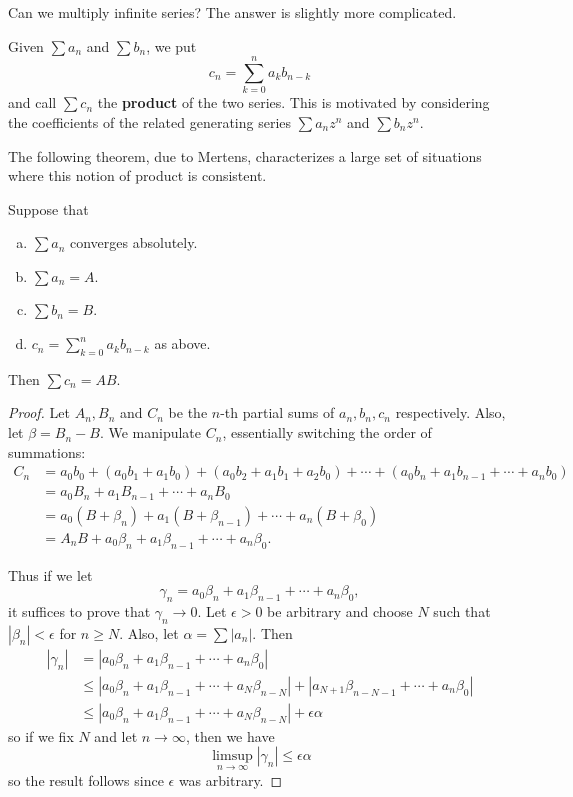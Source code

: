 Can we multiply infinite series? The answer is slightly more complicated.

\begin{definition} %
Given $\sum a_n$ and $\sum b_n$, we put
\[
	c_n = \sum_{k=0}^{n} a_k b_{n-k}
\]
and call $\sum c_n$ the \textbf{product} of the two series. This is motivated by considering the coefficients of the related generating series $\sum a_nz^n$ and $\sum b_nz^n$.
\end{definition}

The following theorem, due to Mertens, characterizes a large set of situations where this notion of product is consistent.

\begin{theorem}[Mertens] %
Suppose that
\begin{enumerate}[(a)]
\item $\sum a_n$ converges absolutely.
\item $\sum a_n = A$.
\item $\sum b_n = B$.
\item $c_n = \sum_{k=0}^{n} a_kb_{n-k}$ as above.
\end{enumerate}
Then $\sum c_n = AB$.

\begin{proof}
Let $A_n, B_n$ and $C_n$ be the $n$-th partial sums of $a_n, b_n, c_n$ respectively. Also, let $\beta = B_n - B$. We manipulate $C_n$, essentially switching the order of summations:
\begin{align*}
C_n &= a_0b_0 + (a_0b_1 + a_1b_0) + (a_0b_2 + a_1b_1 + a_2b_0) + \dotsb + (a_0b_n + a_1b_{n-1} + \dotsb + a_nb_0) \\
	&= a_0B_n + a_1B_{n-1} + \dotsb + a_nB_0 \\
	&= a_0(B + \beta_n) + a_1(B + \beta_{n-1}) + \dotsb + a_n(B + \beta_0) \\
	&= A_nB + a_0\beta_n + a_1\beta_{n-1} + \dotsb + a_n\beta_0.
\end{align*}

Thus if we let 
\[
	\gamma_n = a_0\beta_n + a_1\beta_{n-1} + \dotsb + a_n\beta_0,
\]
it suffices to prove that $\gamma_n \to 0$. Let $\epsilon > 0$ be arbitrary and choose $N$ such that $|\beta_n| < \epsilon$ for $n \ge N$. Also, let $\alpha = \sum |a_n|$. Then
\begin{align*}
|\gamma_n| &= |a_0\beta_n + a_1\beta_{n-1} + \dotsb + a_n\beta_0| \\
	&\le |a_0\beta_n + a_1\beta_{n-1} + \dotsb + a_N\beta_{n-N}| + |a_{N+1}\beta_{n-N-1} + \dotsb + a_n\beta_0| \\
	&\le |a_0\beta_n + a_1\beta_{n-1} + \dotsb + a_N\beta_{n-N}| + \epsilon \alpha
\end{align*}
so if we fix $N$ and let $n \to \infty$, then we have
\[
	\limsup_{n \to \infty} |\gamma_n| \le \epsilon \alpha
\]
so the result follows since $\epsilon$ was arbitrary.
\end{proof}
\end{theorem}

